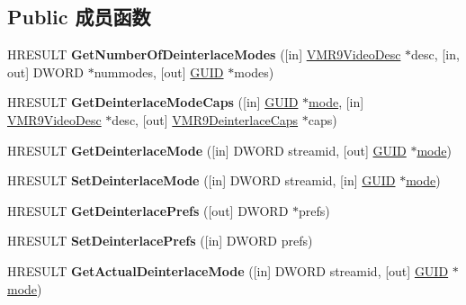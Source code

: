 \subsection*{Public 成员函数}
\begin{DoxyCompactItemize}
\item 
\mbox{\label{interface_i_v_m_r_deinterlace_control9_ac40bbc79cfcf3f2fb273da04e9eb3ff2}} 
H\+R\+E\+S\+U\+LT {\bfseries Get\+Number\+Of\+Deinterlace\+Modes} (\mbox{[}in\mbox{]} \hyperlink{struct___v_m_r9_video_desc}{V\+M\+R9\+Video\+Desc} $\ast$desc, \mbox{[}in, out\mbox{]} D\+W\+O\+RD $\ast$nummodes, \mbox{[}out\mbox{]} \hyperlink{interface_g_u_i_d}{G\+U\+ID} $\ast$modes)
\item 
\mbox{\label{interface_i_v_m_r_deinterlace_control9_a72320bbeeb24490e9e286f3ef6990a5d}} 
H\+R\+E\+S\+U\+LT {\bfseries Get\+Deinterlace\+Mode\+Caps} (\mbox{[}in\mbox{]} \hyperlink{interface_g_u_i_d}{G\+U\+ID} $\ast$\hyperlink{interfacevoid}{mode}, \mbox{[}in\mbox{]} \hyperlink{struct___v_m_r9_video_desc}{V\+M\+R9\+Video\+Desc} $\ast$desc, \mbox{[}out\mbox{]} \hyperlink{struct___v_m_r9_deinterlace_caps}{V\+M\+R9\+Deinterlace\+Caps} $\ast$caps)
\item 
\mbox{\label{interface_i_v_m_r_deinterlace_control9_ae111ad0feeb5fbb82bc3276c3b3a296b}} 
H\+R\+E\+S\+U\+LT {\bfseries Get\+Deinterlace\+Mode} (\mbox{[}in\mbox{]} D\+W\+O\+RD streamid, \mbox{[}out\mbox{]} \hyperlink{interface_g_u_i_d}{G\+U\+ID} $\ast$\hyperlink{interfacevoid}{mode})
\item 
\mbox{\label{interface_i_v_m_r_deinterlace_control9_ad54a9c73efc797d9290fab98c5a31f0e}} 
H\+R\+E\+S\+U\+LT {\bfseries Set\+Deinterlace\+Mode} (\mbox{[}in\mbox{]} D\+W\+O\+RD streamid, \mbox{[}in\mbox{]} \hyperlink{interface_g_u_i_d}{G\+U\+ID} $\ast$\hyperlink{interfacevoid}{mode})
\item 
\mbox{\label{interface_i_v_m_r_deinterlace_control9_ae50498da9a983ad83176a8a57a89cedd}} 
H\+R\+E\+S\+U\+LT {\bfseries Get\+Deinterlace\+Prefs} (\mbox{[}out\mbox{]} D\+W\+O\+RD $\ast$prefs)
\item 
\mbox{\label{interface_i_v_m_r_deinterlace_control9_ab0f93a120f484db3df24dfed35c449d3}} 
H\+R\+E\+S\+U\+LT {\bfseries Set\+Deinterlace\+Prefs} (\mbox{[}in\mbox{]} D\+W\+O\+RD prefs)
\item 
\mbox{\label{interface_i_v_m_r_deinterlace_control9_a56c081570a9aacd92bb4a3c0b43feea2}} 
H\+R\+E\+S\+U\+LT {\bfseries Get\+Actual\+Deinterlace\+Mode} (\mbox{[}in\mbox{]} D\+W\+O\+RD streamid, \mbox{[}out\mbox{]} \hyperlink{interface_g_u_i_d}{G\+U\+ID} $\ast$\hyperlink{interfacevoid}{mode})
\end{DoxyCompactItemize}
